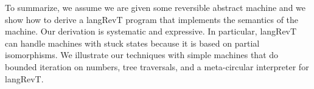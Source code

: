 \documentclass{llncs}
\begin{document}
To summarize, we assume we are given some reversible abstract machine and we
show how to derive a {{langRevT}} program that implements the semantics of
the machine. Our derivation is systematic and expressive. In particular,
{{langRevT}} can handle machines with stuck states because it is based on
partial isomorphisms. We illustrate our techniques with simple machines that
do bounded iteration on numbers, tree traversals, and a meta-circular
interpreter for {{langRevT}}. 




\end{document}

